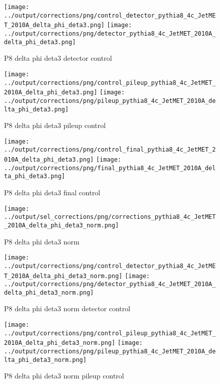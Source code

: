 \documentclass[11pt]{book}
\begin{document}
\begin{figure}[ht]
\centering
\texttt{[image: ../output/corrections/png/control\_detector\_pythia8\_4c\_JetMET\_2010A\_delta\_phi\_deta3.png]}
\texttt{[image: ../output/corrections/png/detector\_pythia8\_4c\_JetMET\_2010A\_delta\_phi\_deta3.png]}
\caption{P8 delta phi deta3 detector control}
\label{fig:p8_JetMET_2010A_delta_phi_deta3_detector_control}
\end{figure}

\begin{figure}[ht]
\centering
\texttt{[image: ../output/corrections/png/control\_pileup\_pythia8\_4c\_JetMET\_2010A\_delta\_phi\_deta3.png]}
\texttt{[image: ../output/corrections/png/pileup\_pythia8\_4c\_JetMET\_2010A\_delta\_phi\_deta3.png]}
\caption{P8 delta phi deta3 pileup control}
\label{fig:p8_JetMET_2010A_delta_phi_deta3_pileup_control}
\end{figure}


\begin{figure}[ht]
\centering
\texttt{[image: ../output/corrections/png/control\_final\_pythia8\_4c\_JetMET\_2010A\_delta\_phi\_deta3.png]}
\texttt{[image: ../output/corrections/png/final\_pythia8\_4c\_JetMET\_2010A\_delta\_phi\_deta3.png]}
\caption{P8 delta phi deta3 final control}
\label{fig:p8_JetMET_2010A_delta_phi_deta3_final_control}
\end{figure}


\begin{figure}[ht]
\centering
\texttt{[image: ../output/sel\_corrections/png/corrections\_pythia8\_4c\_JetMET\_2010A\_delta\_phi\_deta3\_norm.png]}
\caption{P8 delta phi deta3 norm}
\label{fig:p8_JetMET_2010A_delta_phi_deta3_norm}
\end{figure}

\begin{figure}[ht]
\centering
\texttt{[image: ../output/corrections/png/control\_detector\_pythia8\_4c\_JetMET\_2010A\_delta\_phi\_deta3\_norm.png]}
\texttt{[image: ../output/corrections/png/detector\_pythia8\_4c\_JetMET\_2010A\_delta\_phi\_deta3\_norm.png]}
\caption{P8 delta phi deta3 norm detector control}
\label{fig:p8_JetMET_2010A_delta_phi_deta3_norm_detector_control}
\end{figure}

\begin{figure}[ht]
\centering
\texttt{[image: ../output/corrections/png/control\_pileup\_pythia8\_4c\_JetMET\_2010A\_delta\_phi\_deta3\_norm.png]}
\texttt{[image: ../output/corrections/png/pileup\_pythia8\_4c\_JetMET\_2010A\_delta\_phi\_deta3\_norm.png]}
\caption{P8 delta phi deta3 norm pileup control}
\label{fig:p8_JetMET_2010A_delta_phi_deta3_norm_pileup_control}
\end{figure}
\end{document}
